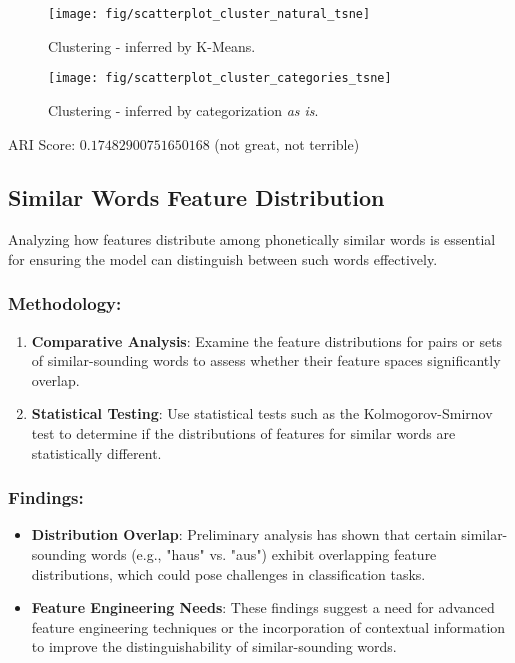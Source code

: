 \begin{figure}[!ht]
	\centering
	\begin{minipage}{0.49\textwidth}
		\centering
		\texttt{[image: fig/scatterplot\_cluster\_natural\_tsne]}
		\caption{Clustering - inferred by K-Means.}
		\label{fig:ClusterNatural}
	\end{minipage}\hfill
	\begin{minipage}{0.49\textwidth}
		\centering
		\texttt{[image: fig/scatterplot\_cluster\_categories\_tsne]}
		\caption{Clustering - inferred by categorization \textit{as is}.}
		\label{fig:ClusterCategorized}
	\end{minipage}
\end{figure}
ARI Score: $0.17482900751650168$ (not great, not terrible)

\subsection{Similar Words Feature Distribution}

Analyzing how features distribute among phonetically similar words is essential for ensuring the model can distinguish between such words effectively.

\subsubsection{Methodology:}

\begin{enumerate}
    \item \textbf{Comparative Analysis}: Examine the feature distributions for pairs or sets of similar-sounding words to assess whether their feature spaces significantly overlap.
    \item \textbf{Statistical Testing}: Use statistical tests such as the Kolmogorov-Smirnov test to determine if the distributions of features for similar words are statistically different.
\end{enumerate}

\subsubsection{Findings:}

\begin{itemize}
    \item \textbf{Distribution Overlap}: Preliminary analysis has shown that certain similar-sounding words (e.g., "haus" vs. "aus") exhibit overlapping feature distributions, which could pose challenges in classification tasks.
    \item \textbf{Feature Engineering Needs}: These findings suggest a need for advanced feature engineering techniques or the incorporation of contextual information to improve the distinguishability of similar-sounding words.
\end{itemize}
